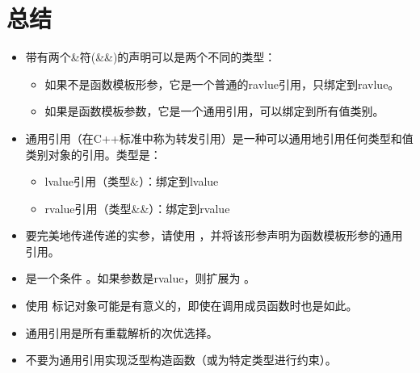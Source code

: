 \section{总结}
\begin{itemize}
	\item 带有两个\&符(\&\&)的声明可以是两个不同的类型：
	\begin{itemize}
		\item 如果不是函数模板形参，它是一个普通的ravlue引用，只绑定到ravlue。
		\item 如果是函数模板参数，它是一个通用引用，可以绑定到所有值类别。
	\end{itemize}
	\item 通用引用（在C++标准中称为转发引用）是一种可以通用地引用任何类型和值类别对象的引用。类型是：
		\begin{itemize}
		\item lvalue引用（类型\&）：绑定到lvalue
		\item rvalue引用（类型\&\&）：绑定到rvalue
	\end{itemize}
	\item 要完美地传递传递的实参，请使用 ，并将该形参声明为函数模板形参的通用引用。
	\item {} 是一个条件 。如果参数是rvalue，则扩展为 。
	\item 使用  标记对象可能是有意义的，即使在调用成员函数时也是如此。
	\item 通用引用是所有重载解析的次优选择。
	\item 不要为通用引用实现泛型构造函数（或为特定类型进行约束）。
\end{itemize}


